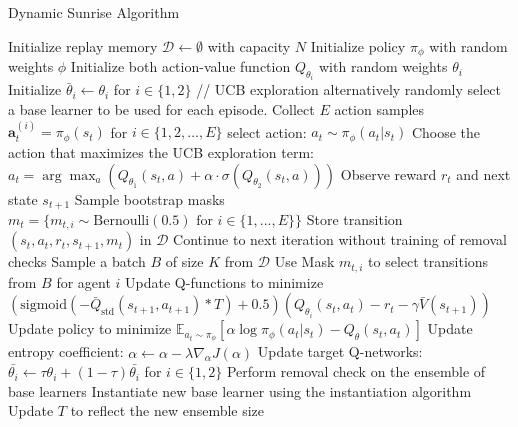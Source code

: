 \documentclass[12pt]{article}
\begin{document}
\begin{algorithm}[H]
\caption{Dynamic Sunrise Algorithm}
\begin{algorithmic}[1]
\State Initialize replay memory $\mathcal{D} \leftarrow \emptyset$ with capacity $N$
\State Initialize policy $\pi_{\phi}$ with random weights $\phi$
\State Initialize both action-value function $Q_{\theta_i}$ with random weights 
$\theta_i$
\State Initialize $\bar{\theta}_{i} \leftarrow \theta_{i}$ for $i \in \{1,2\}$
\Repeat
        \State // UCB exploration alternatively randomly select a base learner to be used for each episode.
        \State Collect $E$ action samples $\bm{a}_{t}^{(i)} = \pi_{\phi}(s_{t})$ for $i \in \{1,2,\ldots,E\}$
        \State select action: $a_{t} \sim \pi_{\phi}(a_{t} | s_{t})$
        \State Choose the action that maximizes the UCB exploration term:
        \State $a_{t} = \arg\max_{a} \left( Q_{\theta_1}(s_{t}, a) + \alpha \cdot \sigma(Q_{\theta_2}(s_{t}, a)) \right)$
        \State Observe reward $r_{t}$ and next state $s_{t+1}$
        \State Sample bootstrap masks $m_{t} = \{m_{t,i} \sim \text{Bernoulli}(0.5) \text{ for } i \in \{1,..., E\}\}$
        \State Store transition $(s_{t}, a_{t}, r_{t}, s_{t+1}, m_t)$ in $\mathcal{D}$
    \EndFor
        \State Continue to next iteration without training of removal checks
    \EndIf
        \State Sample a batch $B$ of size $K$ from $\mathcal{D}$
            \State Use Mask $m_{t,i}$ to select transitions from $B$ for agent $i$
            \State Update Q-functions to minimize $(\text{sigmoid}(-\bar{Q}_{\text{std}}(s_{t+1}, a_{t+1})*T)+0.5)(Q_{\theta_i}(s_t, a_t)-r_t-\gamma \bar{V}(s_{t+1}))$
            \State Update policy to minimize $\mathbb{E}_{a_t \sim \pi_\phi}\left[ \alpha \log \pi_\phi (a_t|s_t) - Q_\theta(s_t, a_t)\right]$
            \State Update entropy coefficient: $\alpha \gets \alpha - \lambda \hat{\nabla}_{\alpha} J(\alpha)$
            \State Update target Q-networks: $\bar{\theta_{i}} \gets \tau\theta_{i} + (1 - \tau) \bar{\theta_{i}}$ for $i \in \{1,2\}$
        \EndFor
    \EndFor
    \State Perform removal check on the ensemble of base learners
        \State Instantiate new base learner using the instantiation algorithm
        \State Update $T$ to reflect the new ensemble size
    \EndFor
{}

\end{algorithmic}
\end{algorithm}
\end{document}
